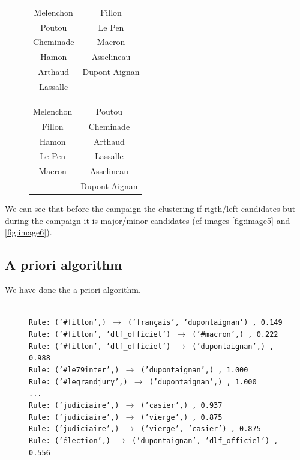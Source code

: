 \documentclass[a4paper]{article}
\theoremstyle{definition}
\begin{document}
\begin{figure}
\begin{center}
\begin{multicols}{2}
\begin{tabular}{ | c | c |}
\hline
Melenchon & Fillon\\
Poutou & Le Pen\\
Cheminade & Macron\\
Hamon & Asselineau\\
Arthaud & Dupont-Aignan\\
Lassalle \\
\hline
\end{tabular}
\bigskip

\begin{tabular}{ | c | c |}
\hline
Melenchon & Poutou\\
Fillon & Cheminade\\
Hamon & Arthaud\\
Le Pen & Lassalle\\
Macron & Asselineau\\
& Dupont-Aignan\\
\hline
\end{tabular}
\bigskip
{}
\end{multicols}
\end{center}
\end{figure}

We can see that before the campaign the clustering if rigth/left candidates but during the campaign it is major/minor candidates (cf images \ref{fig:image5} and \ref{fig:image6}).


\newpage
\subsection{A priori algorithm}
We have done the a priori algorithm.

\begin{figure}
\begingroup
\fontsize{9pt}{12pt}
\texttt{\\
Rule: ('\#fillon',) $\to$ ('français', 'dupontaignan') , 0.149\\
Rule: ('\#fillon', 'dlf\_officiel') $\to$ ('\#macron',) , 0.222\\
Rule: ('\#fillon', 'dlf\_officiel') $\to$ ('dupontaignan',) , 0.988\\
Rule: ('\#le79inter',) $\to$ ('dupontaignan',) , 1.000\\
Rule: ('\#legrandjury',) $\to$ ('dupontaignan',) , 1.000\\
...\\
Rule: ('judiciaire',) $\to$ ('casier',) , 0.937\\
Rule: ('judiciaire',) $\to$ ('vierge',) , 0.875\\
Rule: ('judiciaire',) $\to$ ('vierge', 'casier') , 0.875\\
Rule: ('élection',) $\to$ ('dupontaignan', 'dlf\_officiel') , 0.556\\
}
\endgroup
{}
\end{figure}
\end{document}
